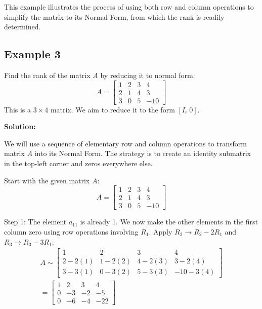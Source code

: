 \documentclass{article}
\begin{document}
This example illustrates the process of using both row and column operations to simplify the matrix to its Normal Form, from which the rank is readily determined.

\subsection{Example 3}
Find the rank of the matrix $A$ by reducing it to normal form:
\[ A = \begin{bmatrix} 1 & 2 & 3 & 4 \\ 2 & 1 & 4 & 3 \\ 3 & 0 & 5 & -10 \end{bmatrix} \]
This is a $3 \times 4$ matrix. We aim to reduce it to the form $[I_r \ 0]$.

\textbf{Solution:}

We will use a sequence of elementary row and column operations to transform matrix $A$ into its Normal Form. The strategy is to create an identity submatrix in the top-left corner and zeros everywhere else.

Start with the given matrix $A$:
\[ A = \begin{bmatrix} 1 & 2 & 3 & 4 \\ 2 & 1 & 4 & 3 \\ 3 & 0 & 5 & -10 \end{bmatrix} \]

Step 1: The element $a_{11}$ is already 1. We now make the other elements in the first column zero using row operations involving $R_1$.
Apply $R_2 \to R_2 - 2R_1$ and $R_3 \to R_3 - 3R_1$:
\begin{align*} A \sim \begin{bmatrix} 1 & 2 & 3 & 4 \\ 2 - 2(1) & 1 - 2(2) & 4 - 2(3) & 3 - 2(4) \\ 3 - 3(1) & 0 - 3(2) & 5 - 3(3) & -10 - 3(4) \end{bmatrix} \\ = \begin{bmatrix} 1 & 2 & 3 & 4 \\ 0 & -3 & -2 & -5 \\ 0 & -6 & -4 & -22 \end{bmatrix}\end{align*}
\end{document}
